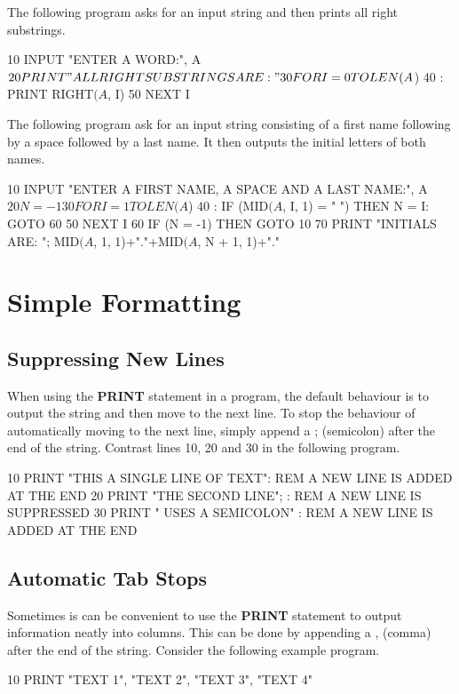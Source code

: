 The following program asks for an input string and then prints all right substrings.
\begin{screencode}
10 INPUT "ENTER A WORD:", A$
20 PRINT "ALL RIGHT SUBSTRINGS ARE:"
30 FOR I = 0 TO LEN(A$)
40 :  PRINT RIGHT$(A$, I)
50 NEXT I
\end{screencode}

The following program ask for an input string consisting of a first name following by a space followed by a last name. It then outputs the initial letters of both names.
\begin{screencode}
10 INPUT "ENTER A FIRST NAME, A SPACE AND A LAST NAME:", A$
20 N = -1
30 FOR I = 1 TO LEN(A$)
40 :  IF (MID$(A$, I, 1) = " ") THEN N = I: GOTO 60
50 NEXT I
60 IF (N = -1) THEN GOTO 10
70 PRINT "INITIALS ARE: "; MID$(A$, 1, 1)+"."+MID$(A$, N + 1, 1)+"."
\end{screencode}

\section{Simple Formatting}

\subsection{Suppressing New Lines}
When using the {\bf PRINT} statement in a program, the default behaviour is to output the string and then move to the next line. To stop the behaviour of automatically moving to the next line, simply append a ; (semicolon) after the end of the string. Contrast lines 10, 20 and 30 in the following program.

\begin{screencode}
10 PRINT "THIS A SINGLE LINE OF TEXT": REM A NEW LINE IS ADDED AT THE END
20 PRINT "THE SECOND LINE"; : REM A NEW LINE IS SUPPRESSED
30 PRINT " USES A SEMICOLON" : REM A NEW LINE IS ADDED AT THE END
\end{screencode}

\subsection{Automatic Tab Stops}
Sometimes is can be convenient to use the {\bf PRINT} statement to output information neatly into columns. This can be done by appending a , (comma) after the end of the string. Consider the following example program.

\begin{screencode}
10 PRINT "TEXT 1", "TEXT 2", "TEXT 3", "TEXT 4"
\end{screencode}

